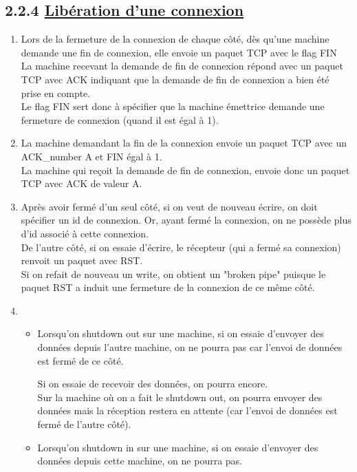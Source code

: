\documentclass{article}
\begin{document}
\subsection*{2.2.4 \underline{Libération d'une connexion}}

\begin{enumerate}[resume]
	\item Lors de la fermeture de la connexion de chaque côté, dès qu'une machine demande une fin de connexion, elle envoie un paquet TCP avec le flag FIN\\
	
La machine recevant la demande de fin de connexion répond avec un paquet TCP avec ACK indiquant que la demande de fin de connexion a bien été prise en compte.\\

Le flag FIN sert donc à spécifier que la machine émettrice demande une fermeture de connexion (quand il est égal à 1).
	
	\item La machine demandant la fin de la connexion envoie un paquet TCP avec un ACK\_number A et FIN égal à 1.\\
	
La machine qui reçoit la demande de fin de connexion, envoie donc un paquet TCP avec ACK de valeur A.

	\item Après avoir fermé d'un seul côté, si on veut de nouveau écrire, on doit spécifier un id de connexion. Or, ayant fermé la connexion, on ne possède plus d'id associé à cette connexion.\\
	
De l'autre côté, si on essaie d'écrire, le récepteur (qui a fermé sa connexion) renvoit un paquet avec RST.\\

Si on refait de nouveau un write, on obtient un "broken pipe" puisque le paquet RST a induit une fermeture de la connexion de ce même côté.

	\item 
	\begin{itemize}
		\item Lorsqu'on shutdown out sur une machine, si on essaie d'envoyer des données depuis l'autre machine, on ne pourra pas car l'envoi de données est fermé de ce côté.
		
Si on essaie de recevoir des données, on pourra encore.\\

Sur la machine où on a fait le shutdown out, on pourra envoyer des données mais la réception restera en attente (car l'envoi de données est fermé de l'autre côté).
		\item Lorsqu'on shutdown in sur une machine, si on essaie d'envoyer des données depuis cette machine, on ne pourra pas.
		

\end{itemize}
\end{enumerate}
\end{document}
